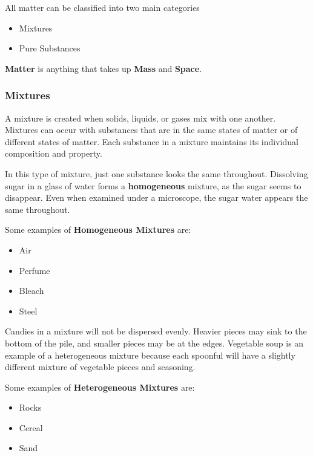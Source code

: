 
All matter can be classified into two main categories

\begin{itemize}
    \item Mixtures
    \item Pure Substances
\end{itemize}

\begin{definition}[Matter]
    \textbf{Matter} is anything that takes up \textbf{Mass} and \textbf{Space}.
\end{definition}

\subsubsection*{Mixtures}

A mixture is created when solids, liquids, or gases mix with one another.
Mixtures can occur with substances that are in the same states of matter or of
different states of matter. Each substance in a mixture maintains its
individual composition and property.

\begin{definition}[Homogeneous]
    In this type of mixture, just one substance looks the same throughout.
    Dissolving sugar in a glass of water forms a \textbf{homogeneous} mixture,
    as the sugar seems to disappear. Even when examined under a microscope, the
    sugar water appears the same throughout.
    
    Some examples of \textbf{Homogeneous Mixtures} are:
    
    \begin{itemize}
        \item Air
        \item Perfume
        \item Bleach
        \item Steel
    \end{itemize}
\end{definition}

\begin{definition}[Heterogeneous]
    Candies in a mixture will not be dispersed evenly. Heavier pieces may sink
    to the bottom of the pile, and smaller pieces may be at the edges.
    Vegetable soup is an example of a heterogeneous mixture because each
    spoonful will have a slightly different mixture of vegetable pieces and
    seasoning.
    
    Some examples of \textbf{Heterogeneous Mixtures} are:
    
    \begin{itemize}
        \item Rocks
        \item Cereal
        \item Sand
    \end{itemize}
\end{definition}


